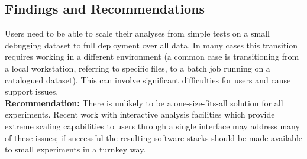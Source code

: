 \subsection{Findings and Recommendations}
Users need to be able to scale their analyses from simple tests on a small debugging dataset to full deployment over all data. In many cases this transition requires working in a different environment (a common case is transitioning from a local workstation, referring to specific files, to a batch job running on a catalogued dataset). This can involve significant difficulties for users and cause support issues.\\
\textbf{Recommendation:} There is unlikely to be a one-size-fits-all solution for all experiments. Recent work with interactive analysis facilities which provide extreme scaling capabilities to users through a single interface may address many of these issues; if successful the resulting software stacks should be made available to small experiments in a turnkey way.


